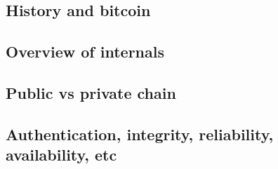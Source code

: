 
\subsection{History and bitcoin}
\subsection{Overview of internals}
\subsection{Public vs private chain}
\subsection{Authentication, integrity, reliability, availability, etc}
